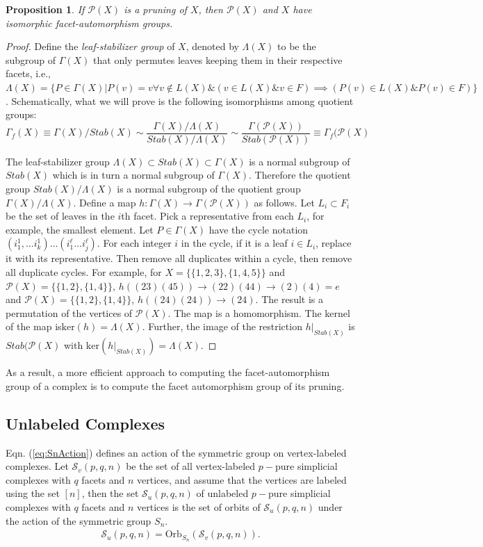 \documentclass[12pt]{article}
\theoremstyle{plain}
\newtheorem{prop}[thm]{Proposition}
\theoremstyle{definition}
\theoremstyle{remark}
\begin{document}
\begin{prop}
If $\mathcal{P}(X)$ is a pruning of $X$, then $\mathcal{P}(X)$ and $X$ have isomorphic facet-automorphism groups. 
\end{prop}
\begin{proof}
Define the {\em leaf-stabilizer group} of $X$, denoted by $\Lambda(X)$ to be the subgroup of $\Gamma(X)$ that only permutes leaves keeping them in their respective facets, i.e., $\Lambda(X) = \{P\in\Gamma(X)|P(v)=v \forall v \notin L(X) \& (v\in L(X) \& v\in F) \implies (P(v)\in L(X) \& P(v)\in F)\}$. Schematically, what we will prove is the following isomorphisms among quotient groups: $$\Gamma_f(X)\equiv \Gamma(X)/Stab(X)\sim\frac{\Gamma(X)/\Lambda(X)}{Stab(X)/\Lambda(X)}\sim \frac{\Gamma(\mathcal{P}(X))}{Stab(\mathcal{P}(X))}\equiv \Gamma_f(\mathcal{P}(X)$$ 

The leaf-stabilizer group $\Lambda(X)\subset Stab(X) \subset \Gamma(X)$ is a normal subgroup of $Stab(X)$ which is in turn a normal subgroup of $\Gamma(X)$. Therefore the quotient group $Stab(X)/\Lambda(X)$ is a normal subgroup of the quotient group $\Gamma(X)/\Lambda(X)$. Define a map $h:\Gamma(X)\rightarrow \Gamma(\mathcal{P}(X))$ as follows. Let $L_i\subset F_i$ be the set of leaves in the $i$th facet. Pick a representative from each $L_i$, for example, the smallest element. Let $P\in\Gamma(X)$ have the cycle notation $(i^1_1,\dots i^1_k)\dots(i^\ell_1\dots i^\ell_j)$. For each integer $i$ in the cycle, if it is a leaf $i\in L_i$, replace it with its representative. Then remove all duplicates within a cycle, then remove all duplicate cycles. For example, for $X=\{\{1,2,3\},\{1,4,5\}\}$ and $\mathcal{P}(X)=\{\{1,2\},\{1,4\}\}$, $h((23)(45))\rightarrow (22)(44)\rightarrow (2)(4) = e$ and $\mathcal{P}(X)=\{\{1,2\},\{1,4\}\}$, $h((24)(24))\rightarrow (24)$. The result is a permutation of the vertices of $\mathcal{P}(X)$. The map is a homomorphism. The kernel of the map is$\mathrm{ker}(h) = \Lambda(X)$.  Further, the image of the restriction $h|_{Stab(X)}$ is $Stab(\mathcal{P}(X)$ with $\mathrm{ker}(h|_{Stab(X)}) = \Lambda(X)$.
\end{proof}

As a result, a more efficient approach to computing the facet-automorphism group of a complex is to compute the facet automorphism group of its pruning.

\subsection{Unlabeled Complexes}
Eqn. (\ref{eq:SnAction}) defines an action of the symmetric group on vertex-labeled complexes. 
Let $\mathcal{S}_v(p,q,n)$ be the set of all vertex-labeled $p-$pure simplicial complexes with $q$ facets and $n$ vertices, and assume that the vertices are labeled using the set $[n]$, then the set $\mathcal{S}_u(p,q,n)$ of unlabeled $p-$pure simplicial complexes with $q$ facets and $n$ vertices is the set of orbits of $\mathcal{S}_u(p,q,n)$ under the action of the symmetric group $S_n$.
\begin{align}
    \mathcal{S}_u(p,q,n) = \mathrm{Orb}_{S_n}(\mathcal{S}_v(p,q,n)).
\end{align}
\end{document}
